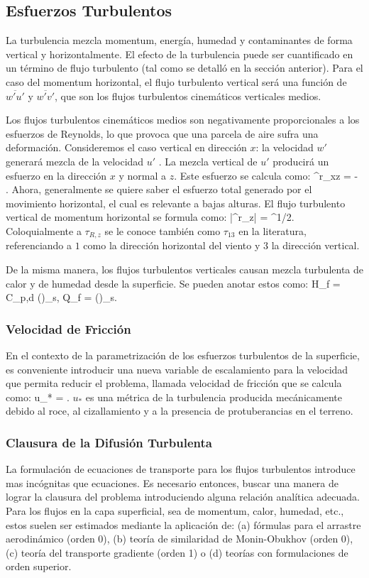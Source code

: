 \subsection{Esfuerzos Turbulentos}
La turbulencia mezcla momentum, energía, humedad y contaminantes de forma vertical y horizontalmente. El efecto de la turbulencia puede ser cuantificado en un término de flujo turbulento (tal como se detalló en la sección anterior). Para el caso del momentum horizontal, el flujo turbulento vertical será una función de $\overline{w'u'}$ y $\overline{w'v'}$, que son los flujos turbulentos cinemáticos verticales medios.

Los flujos turbulentos cinemáticos medios son negativamente proporcionales a los esfuerzos de Reynolds, lo que provoca que una parcela de aire sufra una deformación. Consideremos el caso vertical en dirección $x$: la velocidad $w'$ generará mezcla de la velocidad $u'$ . La mezcla vertical de $u'$ producirá un esfuerzo en la dirección $x$ y normal a $z$. Este esfuerzo se calcula como:
\be 
\tau^r_{xz} = - \rho {}.
\ee
Ahora, generalmente se quiere saber el esfuerzo total generado por el movimiento horizontal, el cual es relevante a bajas alturas. El flujo turbulento vertical de momentum horizontal se formula como:
\be 
|\tau^r_{z}| = ^{1/2}.
\ee
Coloquialmente a $\tau_{R,z}$ se le conoce también como $\tau_{13}$ en la literatura, referenciando a $1$ como la dirección horizontal del viento y $3$ la dirección vertical.

De la misma manera, los flujos turbulentos verticales causan mezcla turbulenta de calor y de humedad desde la superficie. Se pueden anotar estos como:
\be H_f = \rho C_{p,d} ()_s, \ee
\be Q_f = \rho ()_s. \ee
\subsubsection{Velocidad de Fricción}
En el contexto de la parametrización de los esfuerzos turbulentos de la superficie, es conveniente introducir una nueva variable de escalamiento para la velocidad que permita reducir el problema, llamada velocidad de fricción que se calcula como:
\be u_* = . \ee
$u_*$ es una métrica de la turbulencia producida mecánicamente debido al roce, al cizallamiento y a la presencia de protuberancias en el terreno.
\subsubsection{Clausura de la Difusión Turbulenta}
La formulación de ecuaciones de transporte para los flujos turbulentos introduce mas incógnitas que ecuaciones. Es necesario entonces, buscar una manera de lograr la clausura del problema introduciendo alguna relación analítica adecuada. Para los flujos en la capa superficial, sea de momentum, calor, humedad, etc., estos suelen ser estimados mediante la aplicación de: (a) fórmulas para el arrastre aerodinámico (orden 0), (b) teoría de similaridad de Monin-Obukhov (orden 0), (c) teoría del transporte gradiente (orden 1) o (d) teorías con formulaciones de orden superior.

